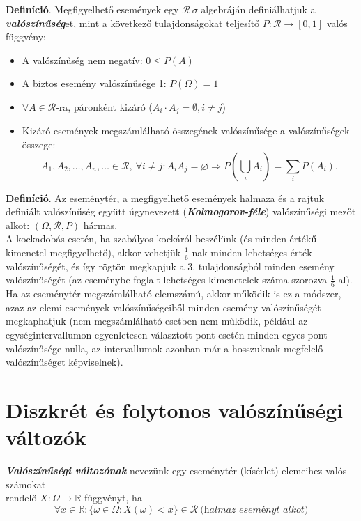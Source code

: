 \documentclass[tikz,12pt,margin=0px]{article}
\newcommand\ddfrac[2]{\frac{\displaystyle #1}{\displaystyle #2}}
\begin{document}
    \noindent \textbf{Definíció}. Megfigyelhető események egy $\mathcal{R}\ \sigma$ algebráján definiálhatjuk a \textbf{\emph{valószínűség}}et, mint a következő tulajdonságokat teljesítő $P: \mathcal{R} \to [0,1]$ valós függvény:
    \begin{itemize}
      \item A valószínűség nem negatív: $0 \leq P(A)$
      \item A biztos esemény valószínűsége 1: $P(\Omega) = 1$
      \item $\forall A \in \mathcal{R}$-ra, páronként kizáró ($A_{i} \cdot A_{j} = \emptyset, i \neq j$)
      \item Kizáró események megszámlálható összegének valószínűsége a valószínűségek összege:
      \[
        A_1, A_2, \ldots, A_n, \ldots \in \mathcal{R},\ \forall i \neq j: A_iA_j = \varnothing \Rightarrow P(\bigcup\limits_{i}A_i) = \sum\limits_{i}P(A_i).
      \]
    \end{itemize}

    \noindent \textbf{Definíció}. Az eseménytér, a megfigyelhető események halmaza és a rajtuk definiált valószínűség együtt úgynevezett (\emph{\textbf{Kolmogorov-féle}}) valószínűségi mezőt alkot: $(\Omega, \mathcal{R}, P)$ hármas.\\

    {\footnotesize
    \noindent A kockadobás esetén, ha szabályos kockáról beszélünk (és minden értékű kimenetel megfigyelhető), akkor vehetjük $\ddfrac{1}{6}$-nak minden lehetséges érték valószínűségét, és így rögtön megkapjuk a 3. tulajdonságból minden esemény valószínűségét (az eseménybe foglalt lehetséges kimenetelek száma szorozva $\ddfrac{1}{6}$-al). Ha az eseménytér megszámlálható elemszámú, akkor működik is ez a módszer, azaz az elemi események valószínűségeiből minden esemény valószínűségét megkaphatjuk (nem megszámlálható esetben nem működik, például az egységintervallumon egyenletesen választott pont esetén minden egyes pont valószínűsége nulla, az intervallumok azonban már a hosszuknak megfelelő valószínűséget képviselnek).
    }
	
	\section*{Diszkrét és folytonos valószínűségi változók}
	
    \noindent \textbf{\emph{Valószínűségi változónak}} nevezünk egy eseménytér (kísérlet) elemeihez valós számokat\\
    rendelő $X : \Omega \to \mathbb{R}$ függvényt, ha
    \[
        \forall x \in \mathbb{R}: \Big\{\omega \in \Omega : X(\omega) < x\Big\} \in \mathcal{R}\ \textit{(halmaz eseményt alkot)}
    \]
	
\end{document}
